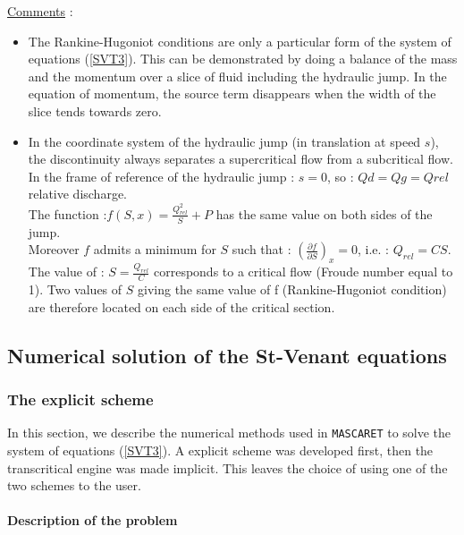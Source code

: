\underline{Comments} :
\begin{itemize}
 \item The Rankine-Hugoniot conditions are only a particular form of the system of equations (\ref{SVT3}). This can be demonstrated by doing a balance of the mass and the momentum over a slice of fluid including the hydraulic jump. In the equation of momentum, the source term disappears when the width of the slice tends towards zero.
 \item In the coordinate system of the hydraulic jump (in translation at speed $s$), the discontinuity always separates a supercritical flow from a subcritical flow. \\ In the frame of reference of the hydraulic jump : $s = 0$, so : $Qd = Qg = Qrel$ relative discharge.\\
The function :$f(S,x) = \frac{Q_{rel}^2}{S} + P$ has the same value on both sides of the jump.\\
Moreover $f$ admits a minimum for $S$ such that : $\left ( \frac{\partial f}{\partial S}\right )_x = 0$, i.e. : $Q_{rel} = C S$. The value of : $S = \frac{Q_{rel}}{C}$ corresponds to a critical flow (Froude number equal to 1). Two values of $S$ giving the same value of f (Rankine-Hugoniot condition) are therefore located on each side of the critical section.

\end{itemize}

\subsection{Numerical solution of the St-Venant equations}

\label{resNumSVT}

\subsubsection{The explicit scheme}

\label{SchemExp}

In this section, we describe the numerical methods used in \texttt{MASCARET} to solve the system of equations (\ref{SVT3}). A explicit scheme was developed first, then the transcritical engine was made implicit. This leaves the choice of using one of the two schemes to the user.

\paragraph{Description of the problem\\}


